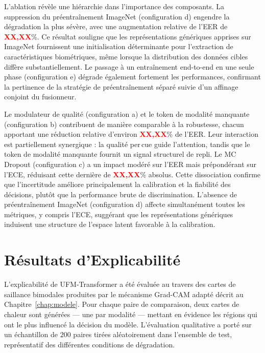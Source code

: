 \documentclass[12pt,a4paper]{report}
\begin{document}

L'ablation r\'{e}v\`{e}le une hi\'{e}rarchie dans l'importance des composants. La suppression du pr\'{e}entra\^{i}nement ImageNet (configuration d) engendre la d\'{e}gradation la plus s\'{e}v\`{e}re, avec une augmentation relative de l'EER de \textcolor{red}{\textbf{XX,XX}}\%. Ce r\'{e}sultat souligne que les repr\'{e}sentations g\'{e}n\'{e}riques apprises sur ImageNet fournissent une initialisation d\'{e}terminante pour l'extraction de caract\'{e}ristiques biom\'{e}triques, m\^{e}me lorsque la distribution des donn\'{e}es cibles diff\`{e}re substantiellement. Le passage \`{a} un entra\^{i}nement end-to-end en une seule phase (configuration e) d\'{e}grade \'{e}galement fortement les performances, confirmant la pertinence de la strat\'{e}gie de pr\'{e}entra\^{i}nement s\'{e}par\'{e} suivie d'un affinage conjoint du fusionneur.

Le modulateur de qualit\'{e} (configuration a) et le token de modalit\'{e} manquante (configuration b) contribuent de mani\`{e}re comparable \`{a} la robustesse, chacun apportant une r\'{e}duction relative d'environ \textcolor{red}{\textbf{XX,XX}}\% de l'EER. Leur interaction est partiellement synergique : la qualit\'{e} per\,{c}ue guide l'attention, tandis que le token de modalit\'{e} manquante fournit un signal structurel de repli. Le MC Dropout (configuration c) a un impact mod\'{e}r\'{e} sur l'EER mais pr\'{e}pond\'{e}rant sur l'ECE, r\'{e}duisant cette derni\`{e}re de \textcolor{red}{\textbf{XX,XX}}\% absolus. Cette dissociation confirme que l'incertitude am\'{e}liore principalement la calibration et la fiabilit\'{e} des d\'{e}cisions, plut\^{o}t que la performance brute de discrimination. L'absence de pr\'{e}entra\^{i}nement ImageNet (configuration d) affecte simultan\'{e}ment toutes les m\'{e}triques, y compris l'ECE, sugg\'{e}rant que les repr\'{e}sentations g\'{e}n\'{e}riques induisent une structure de l'espace latent favorable \`{a} la calibration.

\section{R\'{e}sultats d'Explicabilit\'{e}}
\label{sec:explicabilite-resultats}

L'explicabilit\'{e} de UFM-Transformer a \'{e}t\'{e} \'{e}valu\'{e}e au travers des cartes de saillance bimodales produites par le m\'{e}canisme Grad-CAM adapt\'{e} d\'{e}crit au Chapitre~\ref{chap:modele}. Pour chaque paire de comparaison, deux cartes de chaleur sont g\'{e}n\'{e}r\'{e}es --- une par modalit\'{e} --- mettant en \'{e}vidence les r\'{e}gions qui ont le plus influenc\'{e} la d\'{e}cision du mod\`{e}le. L'\'{e}valuation qualitative a port\'{e} sur un \'{e}chantillon de $200$ paires tir\'{e}es al\'{e}atoirement dans l'ensemble de test, repr\'{e}sentatif des diff\'{e}rentes conditions de d\'{e}gradation.
\end{document}
